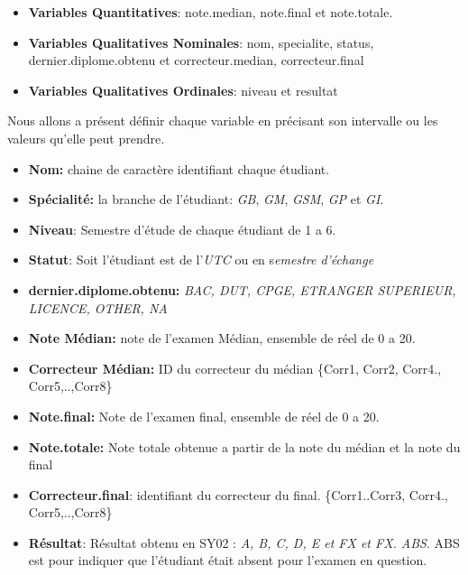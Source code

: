 \documentclass[10pt]{article}
\begin{document}
	
	\begin{itemize}
		\item \textbf{Variables Quantitatives}: note.median, note.final et  note.totale.
		\item  \textbf{Variables Qualitatives Nominales}: nom, specialite, status, dernier.diplome.obtenu et correcteur.median, correcteur.final
		\item  \textbf{Variables Qualitatives Ordinales}: niveau et resultat  \\
	\end{itemize}
	Nous allons a présent définir  chaque variable en précisant son intervalle ou les valeurs qu'elle peut prendre.
	
	\begin{itemize}
		\item \textbf{Nom:} chaine de caractère identifiant chaque étudiant.
		\item \textbf{Spécialité:} la branche de l'étudiant: \textit{GB}, \textit{GM}, \textit{GSM}, \textit{GP} et \textit{GI}.
		\item \textbf{Niveau}: Semestre d'étude de chaque étudiant de 1 a 6.
		\item \textbf{Statut}: Soit l'étudiant est de l'\textit{UTC} ou en s\textit{emestre d'échange}
		\item \textbf{dernier.diplome.obtenu:}
		\textit{BAC, DUT, CPGE, ETRANGER SUPERIEUR, LICENCE, OTHER, NA}
		\item \textbf{Note Médian:} note de l'examen Médian, ensemble de réel de 0 a 20.
		\item \textbf{Correcteur Médian:} ID du correcteur du médian \{Corr1, Corr2, Corr4., Corr5,..,Corr8\}
		\item \textbf{Note.final:} Note de l'examen final, ensemble de réel de 0 a 20.
		\item \textbf{Note.totale:} Note totale obtenue a partir de la note du médian et la note du final
		\item \textbf{Correcteur.final}: identifiant  du correcteur du final. \{Corr1..Corr3, Corr4., Corr5,..,Corr8\}
		\item \textbf{Résultat}: Résultat obtenu en SY02 : \textit{A, B, C, D, E et FX et FX. ABS}. ABS est pour indiquer que l'étudiant était absent pour l'examen en question.
	\end{itemize}
	
\end{document}
